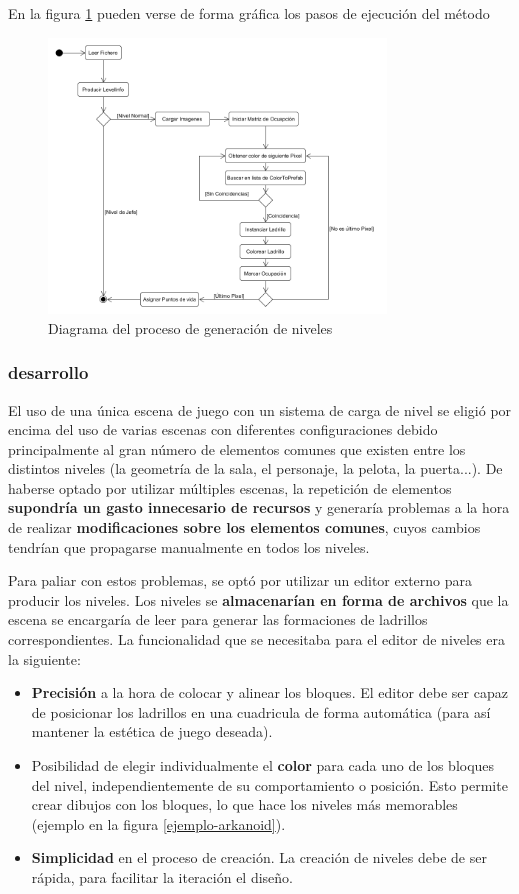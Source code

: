 En la figura \ref{generator_diagram} pueden verse de forma gráfica los pasos de ejecución del método
\begin{figure}[h]
	\includegraphics[width=0.8\textwidth]{images/estructura/niveles/level-generator}
	\centering
	\caption{Diagrama del proceso de generación de niveles}
	\label{generator_diagram}
\end{figure}

\subsubsection{desarrollo}
El uso de una única escena de juego con un sistema de carga de nivel se eligió por encima del uso de varias escenas con diferentes configuraciones debido principalmente al gran número de elementos comunes que existen entre los distintos niveles (la geometría de la sala, el personaje, la pelota, la puerta...). De haberse optado por utilizar múltiples escenas, la repetición de elementos \textbf{supondría un gasto innecesario de recursos} y generaría problemas a la hora de realizar \textbf{modificaciones sobre los elementos comunes}, cuyos cambios tendrían que propagarse manualmente en todos los niveles.

Para paliar con estos problemas, se optó por utilizar un editor externo para producir los niveles. Los niveles se \textbf{almacenarían en forma de archivos} que la escena se encargaría de leer para generar las formaciones de ladrillos correspondientes. La funcionalidad que se necesitaba para el editor de niveles era la siguiente:
\begin{itemize}
  \item \textbf{Precisión} a la hora de colocar y alinear los bloques. El editor debe ser capaz de posicionar los ladrillos en una cuadricula de forma automática (para así mantener la estética de juego deseada).
  \item Posibilidad de elegir individualmente el \textbf{color} para cada uno de los bloques del nivel, independientemente de su comportamiento o posición. Esto permite crear dibujos con los bloques, lo que hace los niveles más memorables (ejemplo en la figura \ref{ejemplo-arkanoid}). 
  \item \textbf{Simplicidad} en el proceso de creación. La creación de niveles debe de ser rápida, para facilitar la iteración el diseño.
\end{itemize}

